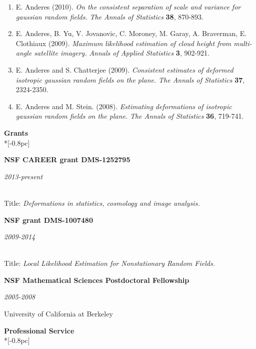 \documentclass[11pt]{article}
\newcommand{\head}[1]{
  \vspace{10pt}
  {\Large \bf #1} \\*[-0.8pc]
  \underline{\hspace{6.07in}}}
\newcommand{\datedentry}[2]{
  \vspace{5pt}
  \begin{minipage}{5in}{\textbf{#1}}\end{minipage}
  \hfill
  \begin{minipage}{1in}{\hfill\textit{#2}}\end{minipage}
  }
\begin{document}
\begin{enumerate}[labelindent=0pt]
\item
E. Anderes (2010).  \textsl{On the consistent separation of scale and variance for gaussian random fields.} \textit{The Annals of Statistics} {\bf 38}, 870-893.



\item
E. Anderes, B. Yu, V. Jovanovic, C. Moroney, M. Garay, A. Braverman, E. Clothiaux (2009).
\textsl{Maximum likelihood estimation of cloud height from multi-angle satellite imagery.}   \textit{Annals of Applied Statistics} {\bf 3}, 902-921.


\item
E. Anderes and S. Chatterjee (2009). \textsl{Consistent estimates of deformed isotropic gaussian random fields on the plane.} \textit{The Annals of Statistics} {\bf 37}, 2324-2350.



\item
E. Anderes and M. Stein. (2008). \textsl{Estimating deformations of isotropic gaussian random fields on the plane.} \textit{The Annals of Statistics} {\bf 36}, 719-741.


 \end{enumerate}

\newpage

%
%

\head{Grants}%
 \vspace{.1mm}


\datedentry{NSF CAREER grant DMS-1252795}{2013-present}\\
Title: {\sl Deformations in statistics, cosmology and image analysis.}

\vspace{7pt}

\datedentry{NSF grant DMS-1007480 }{2009-2014}\\
Title: {\sl Local Likelihood Estimation for Nonstationary Random Fields.}

\vspace{9pt}

\datedentry{NSF Mathematical Sciences Postdoctoral Fellowship}{2005-2008}
University of California at Berkeley



\vspace{5pt}
\head{Professional Service}
\end{document}

